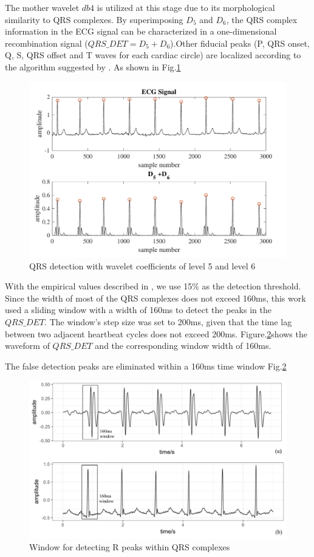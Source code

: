 The mother wavelet $db4$ is utilized at this stage due to its morphological similarity to QRS complexes. By superimposing $D_5$ and $D_6$, the QRS complex information in the ECG signal can be characterized in a one-dimensional recombination signal ($QRS\_DET = D_5+D_6$).Other fiducial peaks (P, QRS onset, Q, S, QRS offset and T waves for each cardiac circle) are localized according to the algorithm suggested by \cite{2012qrs}. As shown in Fig.\ref{fig:QRS_d5d6}

\begin{figure}[t]
\centering
\includegraphics[scale=.7]{Fig/QRS_D5D6.pdf}
\caption{QRS detection with wavelet coefficients of level 5 and level 6}
\label{fig:QRS_d5d6}
\end{figure}


With the empirical values described in \cite{2012qrs}, we use 15\% as the detection threshold. Since the width of most of the QRS complexes does not exceed 160ms, this work used a sliding window with a width of 160ms to detect the peaks in the $QRS\_DET$. The window's step size was set to 200ms, given that the time lag between two adjacent heartbeat cycles does not exceed 200ms.  Figure.\ref{fig:window}shows the waveform of $QRS\_DET$ and the corresponding window width of 160ms. 

The false detection peaks are eliminated within a 160ms time window Fig.\ref{fig:window}


\begin{figure}[t]
\centering
\includegraphics[scale=.5]{Fig/window.pdf}
\caption{Window for detecting R peaks within QRS complexes}
\label{fig:window}
\end{figure}


